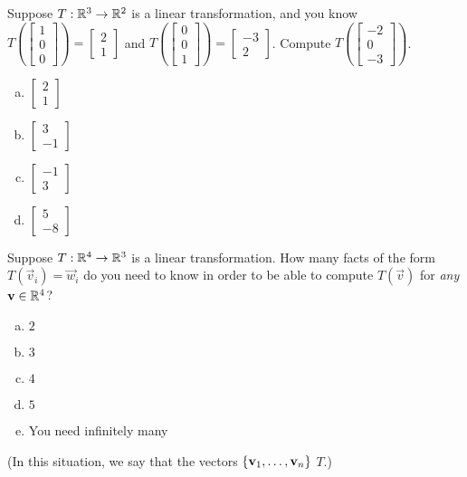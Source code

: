 \begin{applicationActivities}{1}{17}
\begin{activity}{2}
Suppose $T: \mathbb{R}^3 \rightarrow \mathbb{R}^2$ is a linear transformation, and you know $T\left(\begin{bmatrix} 1 \\ 0 \\ 0 \end{bmatrix} \right) = \begin{bmatrix} 2 \\ 1 \end{bmatrix} $ and $T\left(\begin{bmatrix} 0 \\ 0 \\ 1 \end{bmatrix} \right) = \begin{bmatrix} -3 \\ 2 \end{bmatrix} $.  Compute $T\left(\begin{bmatrix} -2 \\ 0 \\ -3 \end{bmatrix}\right)$.
\begin{multicols}{2}
\begin{enumerate}[(a)]
\item $\begin{bmatrix} 2 \\ 1\end{bmatrix}$
\item $\begin{bmatrix} 3 \\ -1 \end{bmatrix}$
\item $\begin{bmatrix} -1 \\ 3 \end{bmatrix}$
\item $\begin{bmatrix} 5 \\ -8 \end{bmatrix}$
\end{enumerate}
\end{multicols}
\end{activity}

\begin{activity}{5}
Suppose $T: \mathbb{R}^4 \rightarrow \mathbb{R}^3$ is a linear transformation.
How many facts of the form $T(\vec{v}_i)=\vec{w}_i$ do you need to know in order to be able to compute $T(\vec{v})$ for \textit{any} $\mathbf{v} \in \mathbb{R}^4$?
\begin{enumerate}[(a)]
\item $2$
\item $3$
\item $4$
\item $5$
\item You need infinitely many
\end{enumerate}
(In this situation, we say that the vectors \(\{\mathbf v_1,\dots,\mathbf v_n\}\)
 \(T\).)
\end{activity}


\end{applicationActivities}
